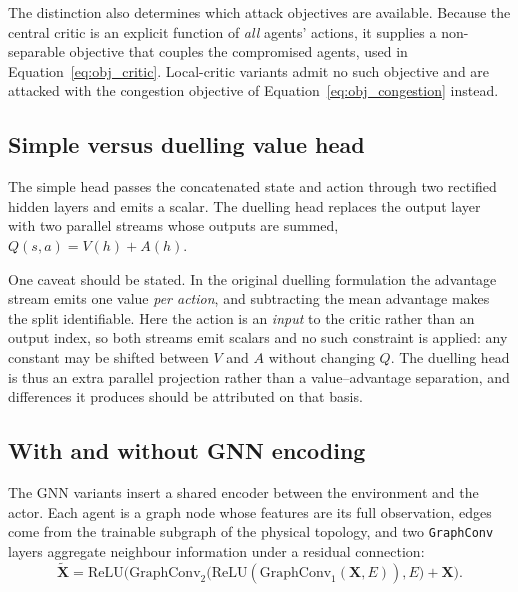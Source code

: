 The distinction also determines which attack objectives are available. Because the
central critic is an explicit function of \emph{all} agents' actions, it supplies a
non-separable objective that couples the compromised agents, used in
Equation~\eqref{eq:obj_critic}. Local-critic variants admit no such objective and
are attacked with the congestion objective of Equation~\eqref{eq:obj_congestion}
instead.

\subsection{Simple versus duelling value head}
\label{subsec:axis_value_head}

The simple head passes the concatenated state and action through two rectified
hidden layers and emits a scalar. The duelling head replaces the output layer with
two parallel streams whose outputs are summed, $Q(s,a) = V(h) + A(h)$.

One caveat should be stated. In the original duelling formulation the advantage
stream emits one value \emph{per action}, and subtracting the mean advantage makes
the split identifiable. Here the action is an \emph{input} to the critic rather than
an output index, so both streams emit scalars and no such constraint is applied: any
constant may be shifted between $V$ and $A$ without changing $Q$. The duelling head
is thus an extra parallel projection rather than a value--advantage separation, and
differences it produces should be attributed on that basis.

\subsection{With and without GNN encoding}
\label{subsec:axis_gnn}

The GNN variants insert a shared encoder between the environment and the actor.
Each agent is a graph node whose features are its full observation, edges come from
the trainable subgraph of the physical topology, and two \texttt{GraphConv} layers
aggregate neighbour information under a residual connection:
\begin{equation}
  \tilde{\mathbf{X}} = \mathrm{ReLU}\Big(
     \mathrm{GraphConv}_2\big(\mathrm{ReLU}(\mathrm{GraphConv}_1(\mathbf{X}, E)), E\big)
     + \mathbf{X} \Big).
  \label{eq:arch_gnn}
\end{equation}

